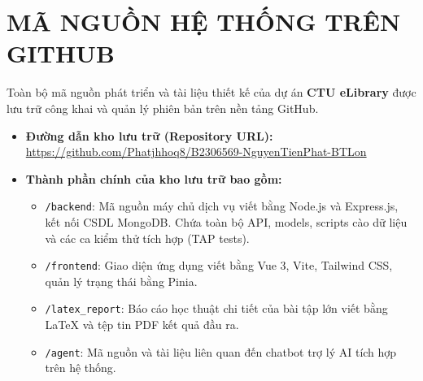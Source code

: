 \documentclass[../main.tex]{subfiles}
\begin{document}
\section*{MÃ NGUỒN HỆ THỐNG TRÊN GITHUB}

Toàn bộ mã nguồn phát triển và tài liệu thiết kế của dự án \textbf{CTU eLibrary} được lưu trữ công khai và quản lý phiên bản trên nền tảng GitHub. 

\begin{itemize}
    \item \textbf{Đường dẫn kho lưu trữ (Repository URL):} \\
    \url{https://github.com/Phatjhhoq8/B2306569-NguyenTienPhat-BTLon}
    
    \item \textbf{Thành phần chính của kho lưu trữ bao gồm:}
    \begin{itemize}
        \item \texttt{/backend}: Mã nguồn máy chủ dịch vụ viết bằng Node.js và Express.js, kết nối CSDL MongoDB. Chứa toàn bộ API, models, scripts cào dữ liệu và các ca kiểm thử tích hợp (TAP tests).
        \item \texttt{/frontend}: Giao diện ứng dụng viết bằng Vue 3, Vite, Tailwind CSS, quản lý trạng thái bằng Pinia.
        \item \texttt{/latex\_report}: Báo cáo học thuật chi tiết của bài tập lớn viết bằng LaTeX và tệp tin PDF kết quả đầu ra.
        \item \texttt{/agent}: Mã nguồn và tài liệu liên quan đến chatbot trợ lý AI tích hợp trên hệ thống.
    \end{itemize}
\end{itemize}
\end{document}
